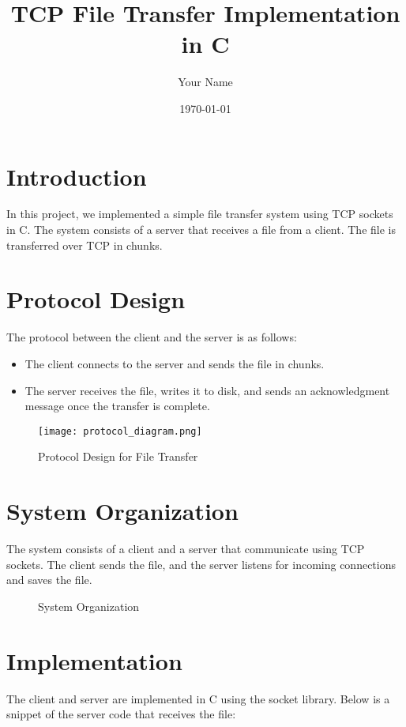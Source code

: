 \documentclass{article}
\title{TCP File Transfer Implementation in C}
\author{Your Name}
\date{\today}
\begin{document}
\maketitle

\section{Introduction}
In this project, we implemented a simple file transfer system using TCP sockets in C. The system consists of a server that receives a file from a client. The file is transferred over TCP in chunks.

\section{Protocol Design}
The protocol between the client and the server is as follows:
\begin{itemize}
    \item The client connects to the server and sends the file in chunks.
    \item The server receives the file, writes it to disk, and sends an acknowledgment message once the transfer is complete.
\end{itemize}

\begin{figure}[h!]
\centering
\texttt{[image: protocol\_diagram.png]}
\caption{Protocol Design for File Transfer}
\end{figure}

\section{System Organization}
The system consists of a client and a server that communicate using TCP sockets. The client sends the file, and the server listens for incoming connections and saves the file. 

\begin{figure}[h!]
\centering
{}
\caption{System Organization}
\end{figure}

\section{Implementation}
The client and server are implemented in C using the socket library. Below is a snippet of the server code that receives the file:
\end{document}

